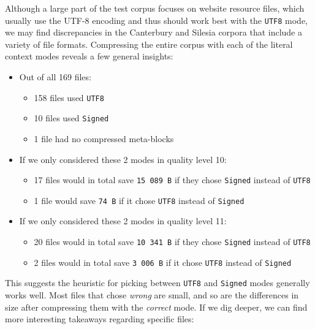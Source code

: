\documentclass[english,master,dept460,male,cpp,cpdeclaration]{diploma}
\newcommand{\nosep}{\itemsep0em}
\begin{document}
		Although a large part of the test corpus focuses on website resource files, which usually use the UTF-8 encoding and thus should work best with the \verb|UTF8| mode, we may find discrepancies in the Canterbury and Silesia corpora that include a variety of file formats. Compressing the entire corpus with each of the literal context modes reveals a few general insights:
		
		\begin{itemize} \nosep
			\item Out of all 169 files:
				\begin{itemize} \nosep
					\item 158 files used \verb|UTF8|
					\item 10 files used \verb|Signed|
					\item 1 file had no compressed meta-blocks
				\end{itemize}
			\item If we only considered these 2 modes in quality level 10:
				\begin{itemize} \nosep
					\item 17 files would in total save \verb|15 089 B| if they chose \verb|Signed| instead of \verb|UTF8|
					\item 1 file would save \verb|74 B| if it chose \verb|UTF8| instead of \verb|Signed|
				\end{itemize}
			\item If we only considered these 2 modes in quality level 11:
				\begin{itemize} \nosep
					\item 20 files would in total save \verb|10 341 B| if they chose \verb|Signed| instead of \verb|UTF8|
					\item 2 files would in total save \verb|3 006 B| if it chose \verb|UTF8| instead of \verb|Signed|
				\end{itemize}
		\end{itemize}
		
		\noindent
		This suggests the heuristic for picking between \verb|UTF8| and \verb|Signed| modes generally works well. Most files that chose \emph{wrong} are small, and so are the differences in size after compressing them with the \emph{correct} mode. If we dig deeper, we can find more interesting takeaways regarding specific files:
		
\end{document}
